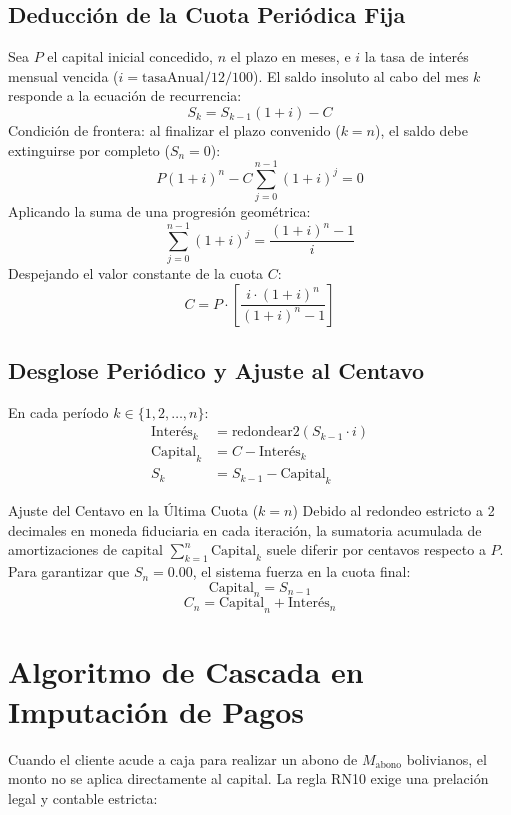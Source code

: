\documentclass[11pt,letterpaper]{report}
\begin{document}
\subsection{Deducción de la Cuota Periódica Fija}
Sea $P$ el capital inicial concedido, $n$ el plazo en meses, e $i$ la tasa de interés mensual vencida ($i = \text{tasaAnual} / 12 / 100$). El saldo insoluto al cabo del mes $k$ responde a la ecuación de recurrencia:
\[ S_k = S_{k-1}(1 + i) - C \]
Condición de frontera: al finalizar el plazo convenido ($k = n$), el saldo debe extinguirse por completo ($S_n = 0$):
\[ P(1 + i)^n - C \sum_{j=0}^{n-1} (1 + i)^j = 0 \]
Aplicando la suma de una progresión geométrica:
\[ \sum_{j=0}^{n-1} (1 + i)^j = \frac{(1 + i)^n - 1}{i} \]
Despejando el valor constante de la cuota $C$:
\begin{equation}
C = P \cdot \left[ \frac{i \cdot (1 + i)^n}{(1 + i)^n - 1} \right]
\end{equation}

\subsection{Desglose Periódico y Ajuste al Centavo}
En cada período $k \in \{1, 2, \dots, n\}$:
\begin{align}
\text{Interés}_k &= \text{redondear2}(S_{k-1} \cdot i) \\
\text{Capital}_k &= C - \text{Interés}_k \\
S_k &= S_{k-1} - \text{Capital}_k
\end{align}

\begin{techNote}{Ajuste del Centavo en la Última Cuota ($k=n$)}
Debido al redondeo estricto a 2 decimales en moneda fiduciaria en cada iteración, la sumatoria acumulada de amortizaciones de capital $\sum_{k=1}^n \text{Capital}_k$ suele diferir por centavos respecto a $P$. Para garantizar que $S_n = 0.00$, el sistema fuerza en la cuota final:
\[ \text{Capital}_n = S_{n-1} \]
\[ C_n = \text{Capital}_n + \text{Interés}_n \]
\end{techNote}

\section{Algoritmo de Cascada en Imputación de Pagos}
Cuando el cliente acude a caja para realizar un abono de $M_{\text{abono}}$ bolivianos, el monto no se aplica directamente al capital. La regla RN10 exige una prelación legal y contable estricta:
\end{document}
